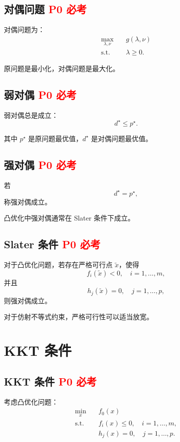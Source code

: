 \documentclass[11pt,a4paper]{ctexart}
\newcommand{\st}{\text{s.t.}}
\newcommand{\Pzero}{\textcolor{red}{\textbf{P0 必考}}}
\theoremstyle{definition}
\theoremstyle{plain}
\theoremstyle{remark}
\begin{document}
\subsection{对偶问题 \Pzero}

对偶问题为：
\[
\begin{aligned}
    \max_{\lambda,\nu}\quad & g(\lambda,\nu)\\
    \st\quad & \lambda\ge0.
\end{aligned}
\]

原问题是最小化，对偶问题是最大化。

\subsection{弱对偶 \Pzero}

弱对偶总是成立：
\[
    d^\star \le p^\star.
\]

其中 $p^\star$ 是原问题最优值，$d^\star$ 是对偶问题最优值。

\subsection{强对偶 \Pzero}

若
\[
    d^\star = p^\star,
\]
称强对偶成立。

凸优化中强对偶通常在 Slater 条件下成立。

\subsection{Slater 条件 \Pzero}

对于凸优化问题，若存在严格可行点 $\tilde{x}$，使得
\[
    f_i(\tilde{x})<0,\quad i=1,\dots,m,
\]
并且
\[
    h_j(\tilde{x})=0,\quad j=1,\dots,p,
\]
则强对偶成立。

对于仿射不等式约束，严格可行性可以适当放宽。

\section{KKT 条件}

\subsection{KKT 条件 \Pzero}

考虑凸优化问题：
\[
\begin{aligned}
    \min_x\quad & f_0(x)\\
    \st\quad & f_i(x)\le0,\quad i=1,\dots,m,\\
    & h_j(x)=0,\quad j=1,\dots,p.
\end{aligned}
\]
\end{document}
